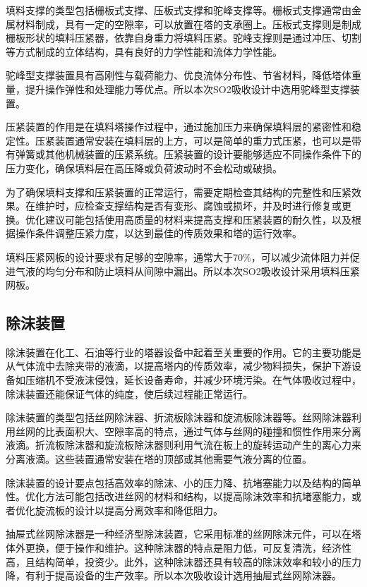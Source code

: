 填料支撑的类型包括栅板式支撑、压板式支撑和驼峰支撑等。栅板式支撑通常由金属材料制成，具有一定的空隙率，可以放置在塔的支承圈上。压板式支撑则是制成栅板形状的填料压紧器，依靠自身重力将填料压紧。驼峰支撑则是通过冲压、切割等方式制成的立体结构，具有良好的力学性能和流体力学性能。

驼峰型支撑装置具有高刚性与载荷能力、优良流体分布性、节省材料，降低塔体重量，提升操作弹性和处理能力等优点。所以本次SO2吸收设计中选用驼峰型支撑装置。

压紧装置的作用是在填料塔操作过程中，通过施加压力来确保填料层的紧密性和稳定性。压紧装置通常安装在填料层的上方，可以是简单的重力式压紧，也可以是带有弹簧或其他机械装置的压紧系统。压紧装置的设计要能够适应不同操作条件下的压力变化，确保填料层在高压降或负荷波动时不会松动或破损。

为了确保填料支撑和压紧装置的正常运行，需要定期检查其结构的完整性和压紧效果。在维护时，应检查支撑结构是否有变形、腐蚀或损坏，并及时进行修复或更换。优化建议可能包括使用高质量的材料来提高支撑和压紧装置的耐久性，以及根据操作条件调整压紧力度，以达到最佳的传质效果和塔的运行效率。

填料压紧网板的设计要求有足够的空隙率，通常大于70\%，可以减少流体阻力并促进气液的均匀分布和防止填料从间隙中漏出。所以本次SO2吸收设计采用填料压紧网板。



\subsection{除沫装置}
除沫装置在化工、石油等行业的塔器设备中起着至关重要的作用。它的主要功能是从气体流中去除夹带的液滴，以提高塔内的传质效率，减少物料损失，保护下游设备如压缩机不受液沫侵蚀，延长设备寿命，并减少环境污染。在气体吸收过程中，除沫装置还能保证气体的纯度，使后续过程能正常运行。

除沫装置的类型包括丝网除沫器、折流板除沫器和旋流板除沫器等。丝网除沫器利用丝网的比表面积大、空隙率高的特点，通过气体与丝网的碰撞和惯性作用来分离液滴。折流板除沫器和旋流板除沫器则利用气流在板上的旋转运动产生的离心力来分离液滴。这些装置通常安装在塔的顶部或其他需要气液分离的位置。

除沫装置的设计要点包括高效率的除沫、小的压力降、抗堵塞能力以及结构的简单性。优化方法可能包括改进丝网的材料和结构，以提高除沫效率和抗堵塞能力，或者优化旋流板的设计以提高分离效率和降低阻力。

抽屉式丝网除沫器是一种经济型除沫装置，它采用标准的丝网除沫元件，可以在塔体外更换，便于操作和维护。这种除沫器的特点是阻力低，可反复清洗，经济性高，且结构简单，投资少。此外，这种除沫器还具有较高的除沫效率和较小的压力降，有利于提高设备的生产效率。所以本次吸收设计选用抽屉式丝网除沫器。